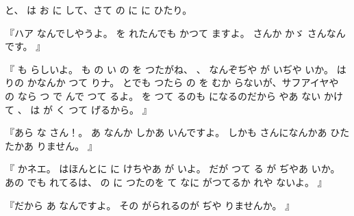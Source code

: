 と、
は
お
に
して、さて
の
に
に
ひたり。

『ハア
なんでしやうよ。
を
れたんでも
かつて
ますよ。
さんか
かゞ
さんなんです。
』

『
も
らしいよ。
も
の
い
の
を
つたがね、
、
なんぞぢや
が
いぢや
いか。
は
りの
かなんか
つて
りナ。
とでも
つたら
の
を
むか
らないが、サフアイヤや
の
なら
つ
で
んで
つて
るよ。
を
つて
るのも
になるのだから
やあ
ない
かけて
、
は
が
く
つて
げるから。
』

『あら
な
さん！。
あ
なんか
しかあ
いんですよ。
しかも
さんになんかあ
ひたたかあ
りません。
』

『
かネエ。
はほんとに
に
けちやあ
が
いよ。
だが
つて
る
が
ぢやあ
いか。
あの
でも
れてるは、
の
に
つたのを
て
なに
がつてるか
れや
ないよ。
』

『だから
あ
なんですよ。
その
がられるのが
ぢや
りませんか。
』


